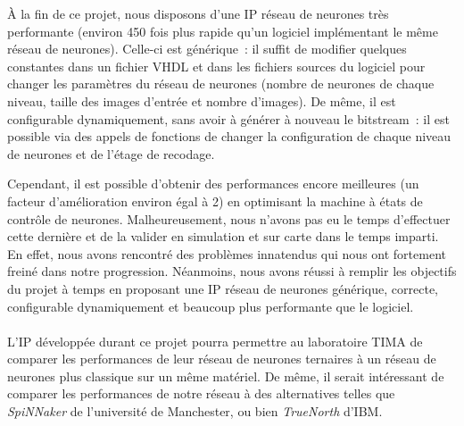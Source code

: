 \` {A} la fin de ce projet, nous disposons d'une IP réseau de neurones très performante (environ 450 fois plus rapide
qu'un logiciel implémentant le même réseau de neurones). Celle-ci est générique~: il suffit de modifier quelques constantes
dans un fichier VHDL et dans les fichiers sources du logiciel pour changer les paramètres du réseau de neurones (nombre de neurones
de chaque niveau, taille des images d'entrée et nombre d'images). De même, il est configurable dynamiquement, sans avoir à
générer à nouveau le bitstream~:
il est possible via des appels de fonctions de changer la configuration de chaque niveau de neurones et de l'étage de recodage.

Cependant, il est possible d'obtenir des performances encore meilleures (un facteur d'amélioration environ égal à 2) en optimisant la machine à
états de contrôle de neurones. Malheureusement, nous n'avons pas eu le temps d'effectuer cette dernière et de la valider en simulation et sur carte
dans le temps imparti. En effet, nous avons rencontré des problèmes innatendus qui nous ont fortement freiné dans notre progression.
Néanmoins, nous avons réussi à remplir les objectifs du projet à temps en proposant une IP réseau de neurones générique, correcte,
configurable dynamiquement et beaucoup plus performante que le logiciel.\\
~\\
L'IP développée durant ce projet pourra permettre au laboratoire TIMA de comparer les performances
de leur réseau de neurones ternaires à un réseau de neurones plus classique sur un même matériel.
De même, il serait intéressant de comparer les performances de notre réseau à des alternatives
telles que {\em SpiNNaker}\cite{painkras2013spinnaker} de l'université de Manchester, ou bien {\em TrueNorth}\cite{modha2014introducing} d'IBM.
